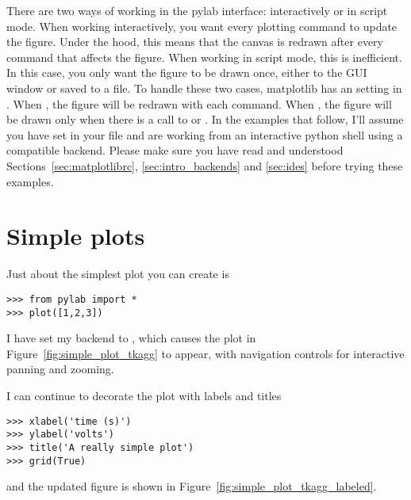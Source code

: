 \documentclass[twoside]{book}
\begin{document}
There are two ways of working in the pylab interface: interactively or
in script mode.  When working interactively, you want every plotting
command to update the figure.  Under the hood, this means that the
canvas is redrawn after every command that affects the figure.  When
working in script mode, this is inefficient.  In this case, you only
want the figure to be drawn once, either to the GUI window or saved to
a file.  To handle these two cases, matplotlib has an 
setting in .  When , the
figure will be redrawn with each command.  When , the figure will be drawn only when there is a call to
 or .  In the examples that follow, I'll
assume you have set  in your
 file and are working from an interactive python
shell using a compatible backend.  Please make sure you have read and
understood Sections~\ref{sec:matplotlibrc}, \ref{sec:intro_backends}
and \ref{sec:ides} before trying these examples.

\section{Simple plots}
\label{sec:simple_plot}

Just about the simplest plot you can create is

\begin{lstlisting}
>>> from pylab import *
>>> plot([1,2,3])
\end{lstlisting}

\noindent I have set my backend to , which causes
the plot in Figure~\ref{fig:simple_plot_tkagg} to appear, with
navigation controls for interactive panning and zooming.


I can continue to decorate the plot with labels and titles

\begin{lstlisting}
>>> xlabel('time (s)')
>>> ylabel('volts')
>>> title('A really simple plot')
>>> grid(True)
\end{lstlisting}

\noindent and the updated figure is shown in Figure~\ref{fig:simple_plot_tkagg_labeled}.
\end{document}
